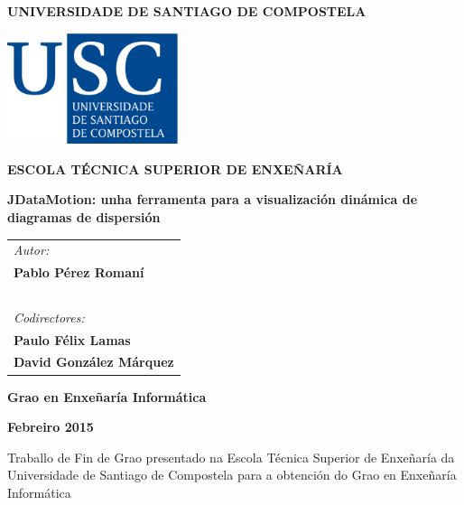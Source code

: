 \pagestyle{empty}
\begin{center}
{\bf\Large UNIVERSIDADE DE SANTIAGO DE COMPOSTELA}

\vspace{0.5cm}
\includegraphics[width=5cm]{figuras/logo_usc.eps}

\vspace{0.5cm}
{\bf\large ESCOLA TÉCNICA SUPERIOR DE ENXEÑARÍA}

\vspace{2cm}
{\bf\LARGE JDataMotion: unha ferramenta para a visualización dinámica de diagramas de dispersión}

\end{center}

\vspace{1cm}
\hspace{3cm}\begin{tabular}{l}
{\it\Large Autor:} \\
{\bf\Large Pablo Pérez Romaní} \\
~ \\
{\it\Large Codirectores:} \\
{\bf\Large Paulo Félix Lamas} \\
{\bf\Large David González Márquez} \\
\end{tabular}

\vspace{1cm}
\begin{center}
{\bf\Large Grao en Enxeñaría Informática}

\vspace{0.5cm}
{\bf\large Febreiro 2015}

\vspace{0.5cm}
Traballo de Fin de Grao presentado na Escola Técnica Superior de Enxeñaría da Universidade de Santiago de Compostela para a obtención do Grao en Enxeñaría Informática
\end{center}


